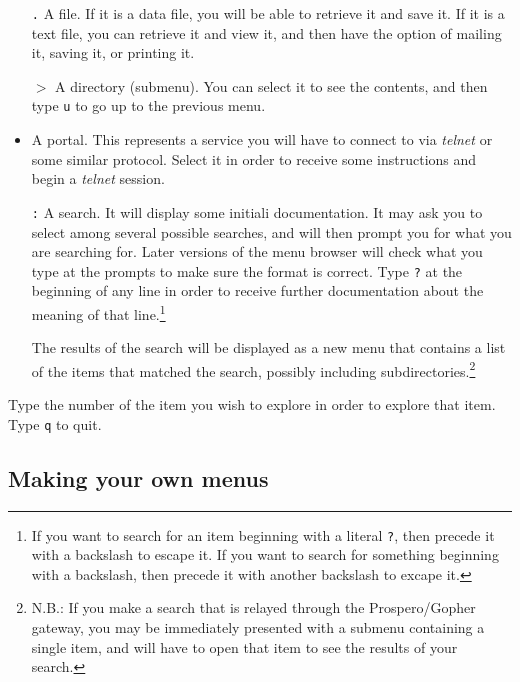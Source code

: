 \begin{itemize}

\item[{\tt .}]  A file.  If it is a data file, you will be able to retrieve
it and save it.  If it is a text file, you can retrieve it and view
it, and then have the option of mailing it, saving it, or printing it.

\item[{\tt $>$}] A directory (submenu).  You can select it to see the
contents, and then type {\tt u} to go up to the previous menu.

\item[{\tt \verb"]"}]  A portal.  This represents a service you will have to
connect to via {\em telnet} or some similar protocol.  Select it in
order to receive some instructions and begin a {\em telnet} session.

\item[{\tt :}] A search.   It will display some initiali documentation.  It may
ask you to select among several possible searches, and will then
prompt you for what you are searching for.  Later versions of the menu
browser will check what you type at the prompts to make sure the
format is correct.  Type {\tt ?} at the
beginning of any line in order to receive further documentation  about
the meaning of that line.\footnote{If you want to search for an item
beginning with a literal {\tt ?}, then precede it with a backslash to
escape it. %
If you want to search for something beginning with a backslash, then precede it with
another backslash to excape it.
}

The results of the search will be displayed as a new menu that
contains a list of the items that matched the search, possibly
including subdirectories.\footnote{N.B.: If you make a search that is relayed
through the Prospero/Gopher gateway, you may be immediately presented with a
submenu containing a single item, and will have to open that item to
see the results of your search.}
\end{itemize}

Type the number of the item you wish to explore in order to explore
that item.  Type {\tt q} to quit.

\subsection{Making your own menus}

